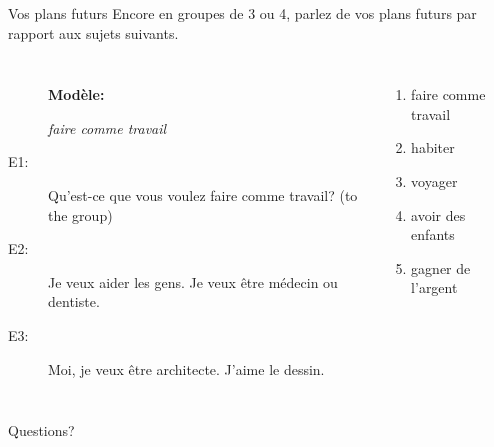 \documentclass{beamer}
\begin{document}
  \begin{frame}{Vos plans futurs}
    Encore en groupes de 3 ou 4, parlez de vos plans futurs par rapport aux sujets suivants. \\
    \begin{columns}
        \begin{description}
          \item[] \textbf{Modèle:}
          \item[] \emph{faire comme travail}
          \item[E1:] Qu'est-ce que vous voulez faire comme travail? (to the group)
          \item[E2:] Je veux aider les gens. Je veux être médecin ou dentiste.
          \item[E3:] Moi, je veux être architecte. J'aime le dessin.
        \end{description}
        \begin{enumerate}
          \item faire comme travail
          \item habiter
          \item voyager
          \item avoir des enfants
          \item gagner de l'argent
        \end{enumerate}
    \end{columns}
  \end{frame}

  \begin{frame}{}
    \begin{center}
      \Large Questions?
    \end{center}
  \end{frame}
\end{document}
